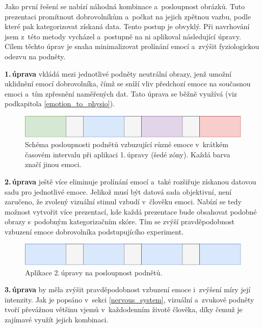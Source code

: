     Jako první řešení se nabízí náhodná kombinace a~posloupnost obrázků. Tuto prezentaci promítnout dobrovolníkům a~počkat na jejich zpětnou vazbu, podle které pak kategorizovat získaná data. Tento postup je obvyklý. Při navrhování jsem z~této metody vycházel a~postupně na ni aplikoval následující úpravy. Cílem těchto úprav je snaha minimalizovat prolínání emocí a~zvýšit fyziologickou odezvu na podněty.
    
    \textbf{1.\,úprava} vkládá mezi jednotlivé podněty neutrální obrazy, jenž umožní uklidnění emocí dobrovolníka, čímž se sníží vliv předchozí emoce na současnou emoci a~tím zpřesnění naměřených dat. Tato úprava se běžně využívá (viz podkapitola \ref{emotion_to_physio}).
    \begin{figure}[H]
        \centering
        \includegraphics[width=\textwidth]{obrazky-figures/podnety_jine_emoce.png}
        \caption{Schéma posloupnosti podnětů vzbuzující různé emoce v~krátkém časovém intervalu při aplikaci 1.\,úpravy (šedé zóny). Každá barva značí jinou emoci.}
        \label{fig:podnety_jine_emoce}
    \end{figure}
    
    \textbf{2.\,úprava} ještě více eliminuje prolínání emocí a~také rozšiřuje získanou datovou sadu pro jednotlivé emoce. Jelikož musí být datová sada objektivní, není zaručeno, že zvolený vizuální stimul vzbudí v~člověku emoci. Nabízí se tedy možnost vytvořit více prezentací, kde každá prezentace bude obsahovat podobné obrazy s~podobným kategorizačním skóre. Tím se zvýší pravděpodobnost vzbuzení emoce dobrovolníka podstupujícího experiment.  
    
    \begin{figure}[H]
        \centering
        \includegraphics[width=\textwidth]{obrazky-figures/podnety_schema.png}
        \caption{Aplikace 2.\,úpravy na posloupnost podnětů.}
        \label{fig:podnety_schema}
    \end{figure}
    
    \textbf{3.\,úprava} by měla zvýšit pravděpodobnost vzbuzení emoce i~zvýšení míry její intenzity. Jak je popsáno v~sekci \ref{nervous_system}, vizuální a~zvukové podněty tvoří převážnou většinu vjemů v~každodenním životě člověka, díky čemuž je zajímavé využít jejich kombinaci. 
    
